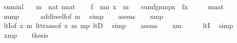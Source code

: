 \begin{isabellebody}
\isanewline
{}\isamarkupfalse%
\ sum{\isacharunderscore}{\kern0pt}inl{\isacharcolon}{\kern0pt}\isanewline
\ \ \ {\isachardoublequoteopen}m\ {\isasymin}\ nat{\isachardoublequoteclose}\ {\isachardoublequoteopen}n{\isasymin}nat{\isachardoublequoteclose}\isanewline
\ \ \ \ {\isachardoublequoteopen}f\ {\isasymin}\ m{\isasymrightarrow}n{\isachardoublequoteclose}\ {\isachardoublequoteopen}x\ {\isasymin}\ m{\isachardoublequoteclose}\isanewline
\ \ \ {\isachardoublequoteopen}sum{\isacharparenleft}{\kern0pt}f{\isacharcomma}{\kern0pt}g{\isacharcomma}{\kern0pt}m{\isacharcomma}{\kern0pt}n{\isacharcomma}{\kern0pt}p{\isacharparenright}{\kern0pt}{\isacharbackquote}{\kern0pt}x\ {\isacharequal}{\kern0pt}\ f{\isacharbackquote}{\kern0pt}x{\isachardoublequoteclose}\isanewline
%
\isadelimproof
%
\endisadelimproof
%
\isatagproof
{}\isamarkupfalse%
\ {\isacharminus}{\kern0pt}\isanewline
\ \ \isamarkupfalse%
\ {\isacartoucheopen}m{\isasymin}nat{\isacartoucheclose}\isanewline
\ \ \isamarkupfalse%
\ {\isachardoublequoteopen}m{\isasymle}m{\isacharhash}{\kern0pt}{\isacharplus}{\kern0pt}p{\isachardoublequoteclose}\isanewline
\ \ \ \ \isamarkupfalse%
\ add{\isacharunderscore}{\kern0pt}le{\isacharunderscore}{\kern0pt}self{\isacharbrackleft}{\kern0pt}of\ m{\isacharbrackright}{\kern0pt}\ \isamarkupfalse%
\ simp\isanewline
\ \ \isamarkupfalse%
\ assms\isanewline
\ \ \isamarkupfalse%
\ {\isachardoublequoteopen}x{\isasymin}m{\isacharhash}{\kern0pt}{\isacharplus}{\kern0pt}p{\isachardoublequoteclose}\isanewline
\ \ \ \ \isamarkupfalse%
\ ltI{\isacharbrackleft}{\kern0pt}of\ x\ m{\isacharbrackright}{\kern0pt}\ lt{\isacharunderscore}{\kern0pt}trans{}{\isacharbrackleft}{\kern0pt}of\ x\ m\ {\isachardoublequoteopen}m{\isacharhash}{\kern0pt}{\isacharplus}{\kern0pt}p{\isachardoublequoteclose}{\isacharbrackright}{\kern0pt}\ ltD\ \isamarkupfalse%
\ simp\isanewline
\ \ \isamarkupfalse%
\ assms\isanewline
\ \ \isamarkupfalse%
\ {\isachardoublequoteopen}x{\isacharless}{\kern0pt}m{\isachardoublequoteclose}\isanewline
\ \ \ \ \isamarkupfalse%
\ ltI\ \isamarkupfalse%
\ simp\isanewline
\ \ \isamarkupfalse%
\ {\isacartoucheopen}x{\isasymin}m{\isacharhash}{\kern0pt}{\isacharplus}{\kern0pt}p{\isacartoucheclose}\isanewline
\ \ \isamarkupfalse%
\ {\isacharquery}{\kern0pt}thesis\ \isamarkupfalse%

\end{isabellebody}
